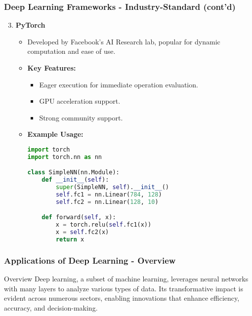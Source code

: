 \documentclass[aspectratio=169]{beamer}
\begin{document}
\begin{frame}[fragile]
    \frametitle{Deep Learning Frameworks - Industry-Standard (cont'd)}
    \begin{enumerate}
        \setcounter{enumi}{2}
        \item \textbf{PyTorch}
            \begin{itemize}
                \item Developed by Facebook’s AI Research lab, popular for dynamic computation and ease of use.
                \item \textbf{Key Features:}
                    \begin{itemize}
                        \item Eager execution for immediate operation evaluation.
                        \item GPU acceleration support.
                        \item Strong community support.
                    \end{itemize}
                \item \textbf{Example Usage:}
                \begin{lstlisting}[language=Python]
import torch
import torch.nn as nn

class SimpleNN(nn.Module):
    def __init__(self):
        super(SimpleNN, self).__init__()
        self.fc1 = nn.Linear(784, 128)
        self.fc2 = nn.Linear(128, 10)

    def forward(self, x):
        x = torch.relu(self.fc1(x))
        x = self.fc2(x)
        return x
                \end{lstlisting}
            \end{itemize}
    \end{enumerate}
\end{frame}

\begin{frame}[fragile]
    \frametitle{Applications of Deep Learning - Overview}
    \begin{block}{Overview}
        Deep learning, a subset of machine learning, leverages neural networks with many layers to analyze various types of data. 
        Its transformative impact is evident across numerous sectors, enabling innovations that enhance efficiency, accuracy, and decision-making.
    \end{block}
\end{frame}
\end{document}
